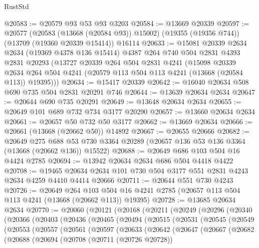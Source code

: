 \begin{lexlean}{RustStd}
\begin{coremodule}
@20583 := @20579 @93 @53 @93 @3203
@20584 := @13669 @20339
@20597 := @20577
    (@20583 (@13668 (@20584 @93)) @15002)
    (@19355 (@19356 @744))
    (@13709 (@19360 @20339 @15414))
    @16114
@20633 := @15081
    @20339
    @2634
    @2634
    (@19369 @4378 @136 @15414)
    @4387
    @264
    @740
    @504
    @2831
    @4393
    @2831
    @20293
    (@13727
      @20339
      @264
      @504
      @2831
      @4241
      (@15098
        @20339
        @2634
        @264
        @504
        @4241
        (@20579 @113 @504 @113 @4241 (@13668 (@20584 @113)) @19395)))
@20634 := @15417 @20339
@20642 := @16040 @20634 @508 @690 @735 @504 @2831 @20291 @746
@20644 := @13639 @20634 @2634
@20647 := @20644 @690 @735 @20291
@20649 := @13648 @20634 @2634
@20655 := @20649 @101 @689 @732 @734 @3177 @20290
@20657 := @13660 @20634 @2634
@20661 := @20657 @50 @732 @50 @3177
@20662 := @13669 @20634
@20666 := @20661 (@13668 (@20662 @50)) @14892
@20667 := @20655 @20666
@20682 := @20649
    @275
    @688
    @53
    @730
    @3364
    @20289
    (@20657 @136 @53 @136 @3364 (@13668 (@20662 @136)) @15522)
@20688 := @20649 @686 @103 @504 @16 @4424 @2785
@20694 := @13942 @20634 @2634 @686 @504 @4418 @4422
@20708 := @19465 @20634 @2634 @101 @730 @504 @3177 @551 @2831 @4243 @2634 @4259 @4410 @4414 @20666
@20711 := @20644 @551 @730 @4243
@20726 := @20649
    @264
    @103
    @504
    @16
    @4241
    @2785
    (@20657 @113 @504 @113 @4241 (@13668 (@20662 @113)) @19395)
@20728 := @13685 @20634 @2634
@20770 := @20060
    (@20121
      (@20168
        (@20211
          (@20249
            (@20296
              (@20340
                (@20366
                  (@20403
                    (@20436
                      (@20465
                        (@20494
                          (@20515
                            (@20531
                              (@20545
                                (@20549
                                  (@20553
                                    (@20557
                                      (@20561
                                        (@20597
                                          (@20633
                                            (@20642
                                              (@20647
                                                (@20667
                                                  (@20682
                                                    (@20688
                                                      (@20694
                                                        (@20708
                                                          (@20711 (@20726 @20728))

\end{coremodule}
\end{lexlean}
